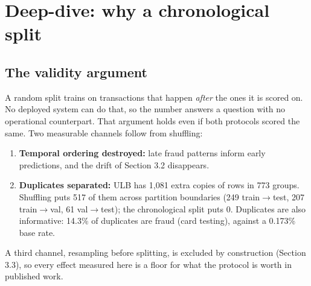 \documentclass[11pt,a4paper]{article}
\begin{document}
\section{Deep-dive: why a chronological split}
\subsection{The validity argument}
A random split trains on transactions that happen \emph{after} the ones it is scored on. No deployed
system can do that, so the number answers a question with no operational counterpart. That argument
holds even if both protocols scored the same. Two measurable channels follow from shuffling:
\begin{enumerate}[leftmargin=1.0cm]
\item \textbf{Temporal ordering destroyed:} late fraud patterns inform early predictions, and the drift
of Section 3.2 disappears.
\item \textbf{Duplicates separated:} ULB has 1,081 extra copies of rows in 773 groups. Shuffling puts
517 of them across partition boundaries (249 train$\to$test, 207 train$\to$val, 61 val$\to$test); the
chronological split puts 0. Duplicates are also informative: 14.3\% of  duplicates are
fraud (card testing), against a 0.173\% base rate.
\end{enumerate}
A third channel, resampling before splitting, is excluded by construction (Section 3.3), so every
effect measured here is a floor for what the protocol is worth in published work.
\end{document}
